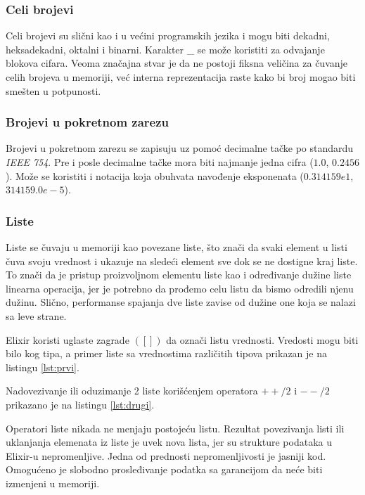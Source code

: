 \documentclass[12pt,oneside]{memoir}
\begin{document}
 

\subsubsection{Celi brojevi}
Celi brojevi su slični kao i u većini programskih jezika i mogu biti dekadni, heksadekadni, oktalni i binarni. Karakter \_ se može koristiti za odvajanje blokova cifara. Veoma značajna stvar je da ne postoji fiksna veličina za čuvanje celih brojeva u memoriji, već interna reprezentacija raste kako bi broj mogao biti smešten u potpunosti.

\subsubsection{Brojevi u pokretnom zarezu}
Brojevi u pokretnom zarezu se zapisuju uz pomoć decimalne tačke po standardu \textit{IEEE 754}. Pre i posle decimalne tačke mora biti najmanje jedna cifra ($1.0$, $0.2456$). Može se koristiti i notacija koja obuhvata navođenje eksponenata ($0.314159e1$, $314159.0e-5$). 

\subsubsection{Liste}
Liste se čuvaju u memoriji kao povezane liste, što znači da svaki element u listi čuva svoju vrednost i ukazuje na sledeći element sve dok se ne dostigne kraj liste. To znači da je pristup proizvoljnom elementu liste kao i određivanje dužine liste linearna operacija, jer je potrebno da prođemo celu listu da bismo odredili njenu dužinu. Slično, performanse spajanja dve liste zavise od dužine one koja se nalazi sa leve strane. 

Elixir koristi uglaste zagrade $([])$ da označi listu vrednosti. Vredosti mogu biti bilo kog tipa, a primer liste sa vrednostima različitih tipova prikazan je na listingu \ref{lst:prvi}.





Nadovezivanje ili oduzimanje 2 liste korišćenjem operatora $++/2$ i $--/2$ prikazano je na listingu \ref{lst:drugi}.



Operatori liste nikada ne menjaju postojeću listu. Rezultat povezivanja listi ili uklanjanja elemenata iz liste je uvek nova lista, jer su strukture podataka u Elixir-u nepromenljive. Jedna od prednosti nepromenljivosti je jasniji kod. Omogućeno je slobodno prosleđivanje podatka sa garancijom da neće biti izmenjeni u memoriji.
\end{document}
